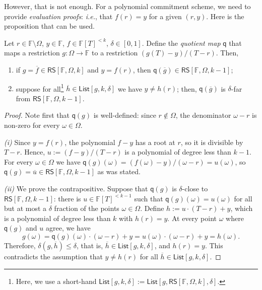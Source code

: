 \documentclass[../../book]{subfiles}
\begin{document}
However, that is not enough. 
For a polynomial commitment scheme, we need to provide \emph{evaluation proofs}: \emph{i.e.}, that $f(r)=y$ for a given $(r,y)$.
Here is the proposition that can be used.

\begin{proposition}[Quotienting]\label{prop:quotienting}
    Let $r \in \mathbb{F} \setminus \Omega$, $y \in \mathbb{F}$, $f \in \mathbb{F}[T]^{<k}$, $\delta \in [0,1]$.
    Define the \emph{quotient map} $\mathsf{q}$ that maps a restriction $g: \Omega \to \mathbb{F}$ to a restriction $(g(T)-y)/(T-r)$. Then,
    \begin{enumerate}
      \item if $g = \overline{f} \in \mathsf{RS}[\mathbb{F}, \Omega, k]$ and $y=f(r)$, then $\mathsf{q}(\overline{g}) \in \mathsf{RS}[\mathbb{F},\Omega,k-1]$;
      \item suppose for all\footnote{Here, we use a short-hand $\mathsf{List}[g,k,\delta] := \mathsf{List}[g,\mathsf{RS}[\mathbb{F},\Omega,k],\delta]$.} $\overline{h} \in \mathsf{List}[g,k,\delta]$ we have $y \neq h(r)$; then, $\mathsf{q}(\overline{g})$ is $\delta$-far from $\mathsf{RS}[\mathbb{F},\Omega,k-1]$.
    \end{enumerate}
\end{proposition}

\begin{proof}
    Note first that $\mathsf{q}(g)$ is well-defined: since $r \notin \Omega$, the denominator $\omega - r$ is non-zero for every $\omega \in \Omega$.

    \textit{(i)} Since $y = f(r)$, the polynomial $f - y$ has a root at $r$, so it is divisible by $T - r$.
    Hence, $u := (f - y)/(T - r)$ is a polynomial of degree less than $k - 1$.
    For every $\omega \in \Omega$ we have $\mathsf{q}(g)(\omega) = (f(\omega) - y)/(\omega - r) = u(\omega)$, so $\mathsf{q}(g) = \overline{u} \in \mathsf{RS}[\mathbb{F}, \Omega, k-1]$ as was stated.

    \textit{(ii)} We prove the contrapositive.
    Suppose that $\mathsf{q}(g)$ is $\delta$-close to $\mathsf{RS}[\mathbb{F}, \Omega, k-1]$: there is $u \in \mathbb{F}[T]^{<k-1}$ such that $\mathsf{q}(g)(\omega) = u(\omega)$ for all but at most a $\delta$ fraction of the points $\omega \in \Omega$.
    Define $h := u \cdot (T - r) + y$, which is a polynomial of degree less than $k$ with $h(r) = y$.
    At every point $\omega$ where $\mathsf{q}(g)$ and $u$ agree, we have
    \begin{equation*}
        g(\omega) = \mathsf{q}(g)(\omega) \cdot (\omega - r) + y = u(\omega) \cdot (\omega - r) + y = h(\omega).
    \end{equation*}
    Therefore, $\delta(g, \overline{h}) \leq \delta$, that is, $\overline{h} \in \mathsf{List}[g, k, \delta]$, and $h(r) = y$.
    This contradicts the assumption that $y \neq h(r)$ for all $\overline{h} \in \mathsf{List}[g, k, \delta]$.
\end{proof}
\end{document}

